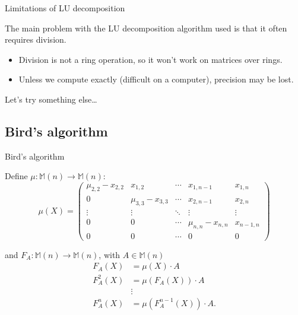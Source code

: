 \documentclass{beamer}
\begin{document}
\begin{frame}{Limitations of LU decomposition}

    The main problem with the LU decomposition algorithm used is that it often requires division.

    \begin{itemize}
        \pause{}
    \item Division is not a ring operation, so it won't work on matrices over rings.
        \pause{}
    \item Unless we compute exactly (difficult on a computer), precision may be lost.
\end{itemize}

\pause{}
Let's try something else\dots

\end{frame}


\subsection{Bird's algorithm}

\begin{frame}{Bird's algorithm}

    Define $\mu : \mathbb{M}(n) \to \mathbb{M}(n)$:
    \[
        \mu(X) =
        \begin{pmatrix}{}
            \mu_{2,2} - x_{2,2} & x_{1,2}             & \cdots & x_{1,n-1}           & x_{1,n} \\
            0                   & \mu_{3,3} - x_{3,3} & \cdots & x_{2,n-1}           & x_{2,n} \\
            \vdots              & \vdots              & \ddots & \vdots              & \vdots \\
            0                   & 0                   & \cdots & \mu_{n,n} - x_{n,n} & x_{n-1,n} \\
            0                   & 0                   & \cdots & 0                   & 0
        \end{pmatrix}
    \]

    \pause{}

    and $F_A : \mathbb{M}(n) \to \mathbb{M}(n)$,
    with $A \in \mathbb{M}(n)$
    \begin{align*}{}
        F_A(X)    & = \mu(X)\cdot A \\
        F_A^2(X)  & = \mu(F_A(X)) \cdot A \\
                  & \vdots \\
        F_A^n(X)  & = \mu(F_A^{n-1}(X)) \cdot A. \\
    \end{align*}

\end{frame}
\end{document}
